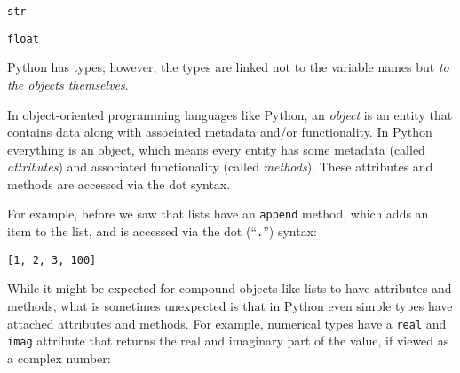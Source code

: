 \begin{verbatim}
str
\end{verbatim}

\begin{Shaded}
\begin{Highlighting}[]
\OperatorTok{=} 
\end{Highlighting}
\end{Shaded}

\begin{verbatim}
float
\end{verbatim}

Python has types; however, the types are linked not to the variable
names but \emph{to the objects themselves}.

In object-oriented programming languages like Python, an \emph{object}
is an entity that contains data along with associated metadata and/or
functionality. In Python everything is an object, which means every
entity has some metadata (called \emph{attributes}) and associated
functionality (called \emph{methods}). These attributes and methods are
accessed via the dot syntax.

For example, before we saw that lists have an \texttt{append} method,
which adds an item to the list, and is accessed via the dot
(``\texttt{.}'') syntax:

\begin{Shaded}
\begin{Highlighting}[]
\OperatorTok{=} \NormalTok{[}\NormalTok{, }\NormalTok{, }\NormalTok{]}
\NormalTok{)}
\end{Highlighting}
\end{Shaded}

\begin{verbatim}
[1, 2, 3, 100]
\end{verbatim}

While it might be expected for compound objects like lists to have
attributes and methods, what is sometimes unexpected is that in Python
even simple types have attached attributes and methods. For example,
numerical types have a \texttt{real} and \texttt{imag} attribute that
returns the real and imaginary part of the value, if viewed as a complex
number:

\begin{Shaded}
\begin{Highlighting}[]
\OperatorTok{=} 
\NormalTok{)}
\end{Highlighting}
\end{Shaded}

